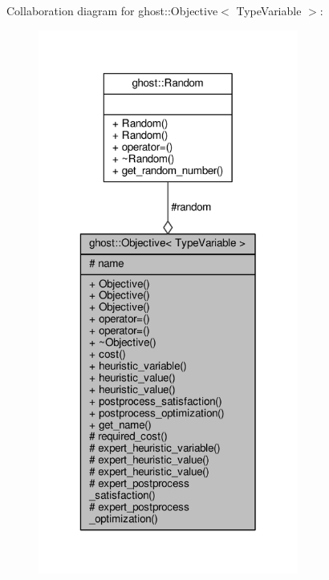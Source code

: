 Collaboration diagram for ghost\-:\-:Objective$<$ Type\-Variable $>$\-:
\nopagebreak
\begin{figure}[H]
\begin{center}
\leavevmode
\includegraphics[width=242pt]{classghost_1_1Objective__coll__graph}
\end{center}
\end{figure}
